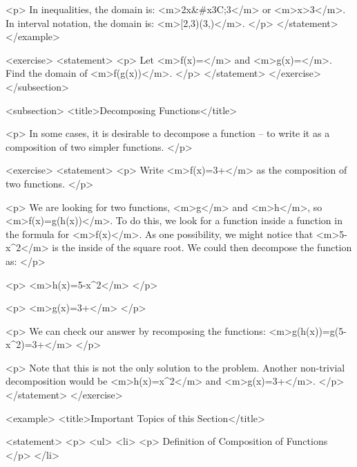                 <p>
                    In inequalities, the domain is: <m>2\leq x&#x3C;3</m> or <m>x>3</m>.
                    In interval notation, the domain is: <m>[2,3)\cup(3,\infty)</m>.
                </p>
            </statement>
        </example>

        <exercise>
            <statement>
                <p>
                    Let <m>f(x)=</m> and <m>g(x)=</m>.
                    Find the domain of <m>f(g(x))</m>.
                </p>
            </statement>
        </exercise>
    </subsection>


    <subsection>
        <title>Decomposing Functions</title>

        <p>
            In some cases, it is desirable to decompose a function – to write it as a composition of two simpler functions.
        </p>

        <exercise>
            <statement>
                <p>
                    Write <m>f(x)=3+</m> as the composition of two functions.
                </p>

                <p>
                    We are looking for two functions, <m>g</m> and <m>h</m>, so <m>f(x)=g(h(x))</m>.
                    To do this, we look for a function inside a function in the formula for <m>f(x)</m>.
                    As one possibility, we might notice that <m>5-x^{2}</m> is the inside of the square root.
                    We could then decompose the function as:
                </p>

                <p>
                    <m>h(x)=5-x^{2}</m>
                </p>

                <p>
                    <m>g(x)=3+</m>
                </p>

                <p>
                    We can check our answer by recomposing the functions: <m>g(h(x))=g(5-x^{2})=3+</m>
                </p>

                <p>
                    Note that this is not the only solution to the problem.
                    Another non-trivial decomposition would be <m>h(x)=x^{2}</m> and <m>g(x)=3+</m>.
                </p>
            </statement>
        </exercise>

        <example>
            <title>Important Topics of this Section</title>

            <statement>
                <p>
                    <ul>
                        <li>
                            <p>
                                Definition of Composition of Functions
                            </p>
                        </li>


